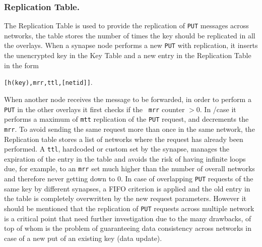 \subsubsection{Replication Table.}
%
The Replication Table is used to provide the replication of {\tt PUT}
messages across networks, the table stores the number of times the key
should be replicated in all the overlays.  When a synapse node
performs a new {\tt PUT} with replication, it inserts the unencrypted
key in the Key Table and a new entry in the Replication Table in the
form
\begin{center}
{\tt  [h(key),mrr,ttl,[netid]]}.
\end{center}
%
When another node receives the message to be forwarded, in order to
perform a {\tt PUT} in the other overlays it first checks if the {\tt
  mrr} counter $> 0$.  In /case it performs a maximum of {\tt mtt}
replication of the {\tt PUT} request, and decrements the {\tt mrr}.
To avoid sending the same request more than once in the same network,
the Replication table stores a list of networks where the request has
already been performed. A {\tt ttl}, hardcoded or custom set by the
synapse, manages the expiration of the entry in the table and avoids
the risk of having infinite loops due, for example, to an {\tt mrr}
set much higher than the number of overall networks and therefore
never getting down to 0.  In case of overlapping {\tt PUT} requests of
the same key by different synapses, a FIFO criterion is applied and
the old entry in the table is completely overwritten by the new
request parameters. However it should be mentioned that the
replication of {\tt PUT} requests across multiple network is a
critical point that need further investigation due to the many
drawbacks, of top of whom is the problem of guaranteeing data
consistency across networks in case of a new put of an existing key
(data update).

